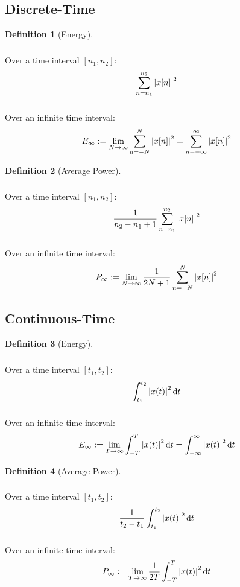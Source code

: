 \documentclass[10pt,UTF8]{article}
\newenvironment{definition box}
{\begin{tcolorbox}[colback=blue!5!white,colframe=blue!75!black,parbox=false,before upper=\par,before lower=\par]}
{\end{tcolorbox}}
\theoremstyle{definition}
\newtheorem*{definition inner}{Definition}
\newenvironment{definition}[1][]
{\begin{definition box}\begin{definition inner}[#1]\hfill\par}
{\end{definition inner}\end{definition box}}
\theoremstyle{remark}
\begin{document}
\noindent
\begin{minipage}[t]{0.45\textwidth}
    \subsection{Discrete-Time}
    \begin{definition}[Energy]
        \subparagraph{}Over a time interval $[n_1, n_2]$:
        \[
            \sum_{n=n_1}^{n_2} \abs{x[n]}^2
        \]
        \subparagraph{}Over an infinite time interval:
        \[
            E_{\infty} := \lim_{N\to\infty} \sum_{n=-N}^N \abs{x[n]}^2
            = \sum_{n=-\infty}^{\infty} \abs{x[n]}^2
        \]
    \end{definition}
    \begin{definition}[Average Power]
        \subparagraph{}Over a time interval $[n_1, n_2]$:
        \[
            \frac{1}{n_2 - n_1 + 1} \sum_{n=n_1}^{n_2} \abs{x[n]}^2
        \]
        \subparagraph{}Over an infinite time interval:
        \[
            P_{\infty} := \lim_{N\to\infty} \frac{1}{2 N+1} \sum_{n=-N}^N \abs{x[n]}^2
        \]
    \end{definition}
\end{minipage}\hfill
\begin{minipage}[t]{0.45\textwidth}
    \subsection{Continuous-Time}
    \begin{definition}[Energy]
        \subparagraph{}Over a time interval $[t_1, t_2]$:
        \[
            \int_{t_1}^{t_2} \abs{x(t)}^2 \dd{t}
        \]
        \subparagraph{}Over an infinite time interval:
        \[
            E_{\infty} := \lim_{T\to\infty} \int_{-T}^T \abs{x(t)}^2 \dd{t}
            = \int_{-\infty}^{\infty} \abs{x(t)}^2 \dd{t}
        \]
    \end{definition}
    \begin{definition}[Average Power]
        \subparagraph{}Over a time interval $[t_1, t_2]$:
        \[
            \frac{1}{t_2 - t_1} \int_{t_1}^{t_2} \abs{x(t)}^2 \dd{t}
        \]
        \subparagraph{}Over an infinite time interval:
        \[
            P_{\infty} := \lim_{T\to\infty} \frac{1}{2 T} \int_{-T}^T \abs{x(t)}^2 \dd{t}
        \]
    \end{definition}
\end{minipage}
\end{document}
